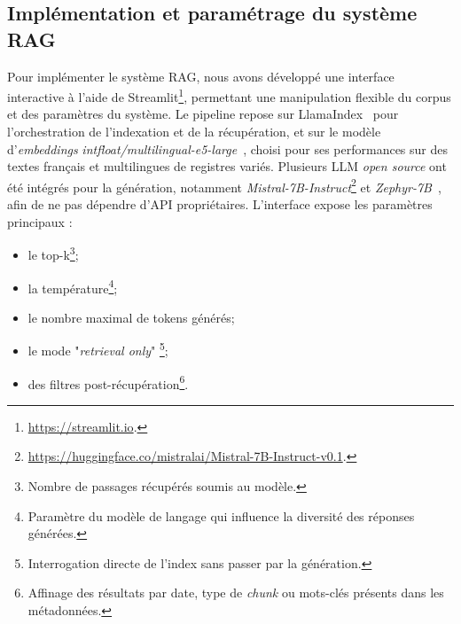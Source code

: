 \documentclass[final, fra]{anthology-ch}     %
\begin{document}
\subsection{Implémentation et paramétrage du système RAG}
Pour implémenter le système RAG, nous avons développé une interface interactive à l'aide de Streamlit\footnote{\url{https://streamlit.io}.}, permettant une manipulation flexible du corpus et des paramètres du système. Le pipeline repose sur LlamaIndex~\cite{Liu_LlamaIndex_2022} pour l'orchestration de l'indexation et de la récupération, et sur le modèle d'\textit{embeddings} \textit{intfloat/multilingual-e5-large}~\cite{wang2024multilingual}, choisi pour ses performances sur des textes français et multilingues de registres variés. Plusieurs LLM \textit{open source} ont été intégrés pour la génération, notamment \textit{Mistral-7B-Instruct}\footnote{\url{https://huggingface.co/mistralai/Mistral-7B-Instruct-v0.1}.} et \textit{Zephyr-7B}~\cite{tunstall2023zephyr}, afin de ne pas dépendre d'API propriétaires. L'interface expose les paramètres principaux : 
\begin{itemize} 
    \item le top-k\footnote{Nombre de passages récupérés soumis au modèle.};
    \item la température\footnote{Paramètre du modèle de langage qui influence la diversité des réponses générées.}; 
    \item le nombre maximal de tokens générés;
    \item le mode "\textit{retrieval only}" \footnote{Interrogation directe de l'index sans passer par la génération.};
    \item des filtres post-récupération\footnote{Affinage des résultats par date, type de \textit{chunk} ou mots-clés présents dans les métadonnées.}.
\end{itemize}
\end{document}
